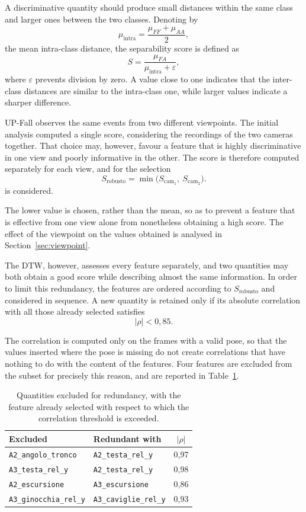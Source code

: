 A discriminative quantity should produce small distances within the same class and larger ones between the two classes. Denoting by
\[
\mu_{\mathrm{intra}}=\frac{\mu_{FF}+\mu_{AA}}{2},
\]
the mean intra-class distance, the separability score is defined as
\[
S=
\frac{\mu_{FA}}
     {\mu_{\mathrm{intra}}+\varepsilon},
\]
where \(\varepsilon\) prevents division by zero. A value close to one indicates that the inter-class distances are similar to the intra-class one, while larger values indicate a sharper difference.

UP-Fall observes the same events from two different viewpoints. The initial analysis computed a single score, considering the recordings of the two cameras together. That choice may, however, favour a feature that is highly discriminative in one view and poorly informative in the other. The score is therefore computed separately for each view, and for the selection
\[
S_{\text{robusto}} = \min\big(S_{\text{cam}_1},\ S_{\text{cam}_2}\big).
\]
is considered.

The lower value is chosen, rather than the mean, so as to prevent a feature that is effective from one view alone from nonetheless obtaining a high score. The effect of the viewpoint on the values obtained is analysed in Section~\ref{sec:viewpoint}.

The DTW, however, assesses every feature separately, and two quantities may both obtain a good score while describing almost the same information. In order to limit this redundancy, the features are ordered according to \(S_{\text{robusto}}\) and considered in sequence. A new quantity is retained only if its absolute correlation with all those already selected satisfies
\[
|\rho|<0{,}85.
\]

The correlation is computed only on the frames with a valid pose, so that the values inserted where the pose is missing do not create correlations that have nothing to do with the content of the features.
Four features are excluded from the subset for precisely this reason, and are reported in Table~\ref{tab:ridondanti}.

\begin{table}[ht]
\centering
\caption{Quantities excluded for redundancy, with the feature already selected with respect to which the correlation threshold is exceeded.}
\label{tab:ridondanti}
\begin{tabular}{@{}llc@{}}
\toprule
\textbf{Excluded} & \textbf{Redundant with} & \textbf{\(|\rho|\)} \\
\midrule
\texttt{A2\_angolo\_tronco}    & \texttt{A2\_testa\_rel\_y}    & 0,97 \\
\texttt{A3\_testa\_rel\_y}     & \texttt{A2\_testa\_rel\_y}    & 0,98 \\
\texttt{A2\_escursione}        & \texttt{A3\_escursione}       & 0,86 \\
\texttt{A3\_ginocchia\_rel\_y} & \texttt{A3\_caviglie\_rel\_y} & 0,93 \\
\bottomrule
\end{tabular}
\end{table}

